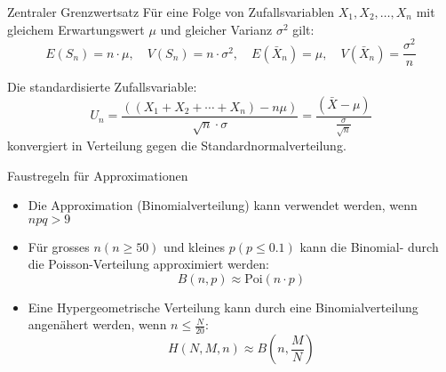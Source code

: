 \begin{theorem}{Zentraler Grenzwertsatz}
Für eine Folge von Zufallsvariablen $X_1, X_2, \ldots, X_n$ mit gleichem Erwartungswert $\mu$ und gleicher Varianz $\sigma^2$ gilt:
$$
E(S_n)=n \cdot \mu, \quad V(S_n)=n \cdot \sigma^2, \quad E(\bar{X}_n)=\mu, \quad V(\bar{X}_n)=\frac{\sigma^2}{n}
$$

Die standardisierte Zufallsvariable:
$$
U_n=\frac{((X_1+X_2+\cdots+X_n)-n\mu)}{\sqrt{n} \cdot \sigma}=\frac{(\bar{X}-\mu)}{\frac{\sigma}{\sqrt{n}}}
$$
konvergiert in Verteilung gegen die Standardnormalverteilung.
\end{theorem}

\begin{concept}{Faustregeln für Approximationen}
\begin{itemize}
  \item Die Approximation (Binomialverteilung) kann verwendet werden, wenn $npq > 9$
  \item Für grosses $n(n \geq 50)$ und kleines $p(p \leq 0.1)$ kann die Binomial- durch die Poisson-Verteilung approximiert werden:
  $$
  B(n,p) \approx \text{Poi}(n \cdot p)
  $$
  \item Eine Hypergeometrische Verteilung kann durch eine Binomialverteilung angenähert werden, wenn $n \leq \frac{N}{20}$:
  $$
  H(N,M,n) \approx B(n,\frac{M}{N})
  $$
\end{itemize}
\end{concept}
